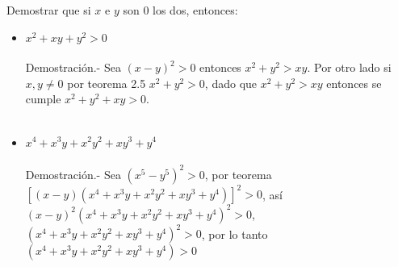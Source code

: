 \begin{teo}
Demostrar que si $x$ e $y$ son $0$ los dos, entonces:\\
\begin{itemize}
\item $x^2+xy+y^2>0$\\\\
Demostración.- \;Sea $(x-y)^2>0$ entonces $x^2+y^2>xy$. Por otro lado  si $x,y \neq 0$ por teorema 2.5 \; $x^2+y^2>0$, dado que $x^2+y^2>xy$ entonces se cumple $x^2+y^2+xy>0$.\\\\
\item $x^4+x^3y+x^2y^2+xy^3+y^4$ \\\\
Demostración.- \; Sea $(x^5-y^5)^2>0$, por teorema $\left[ (x-y)(x^4+x^3y+x^2y^2+xy^3+y^4) \right]^2>0$, así $(x-y)^2(x^4+x^3y+x^2y^2+xy^3+y^4)^2>0$, \; $(x^4+x^3y+x^2y^2+xy^3+y^4)^2>0$, por lo tanto $(x^4+x^3y+x^2y^2+xy^3+y^4)>0$ \\\\
\end{itemize}
\end{teo}


